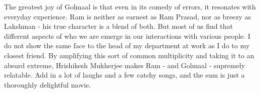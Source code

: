 \documentclass{article}
\begin{document}
The greatest joy of Golmaal is that even in its comedy of errors, it resonates with everyday experience.  Ram is neither as earnest as Ram Prasad, nor as breezy as Lakshman - his true character is a blend of both.  But most of us find that different aspects of who we are emerge in our interactions with various people.  I do not show the same face to the head of my department at work as I do to my closest friend.  By amplifying this sort of common multiplicity and taking it to an absurd extreme, Hrishikesh Mukherjee makes Ram - and Golmaal - supremely relatable.  Add in a lot of laughs and a few catchy songs, and the sum is just a thoroughly delightful movie.
\end{document}
